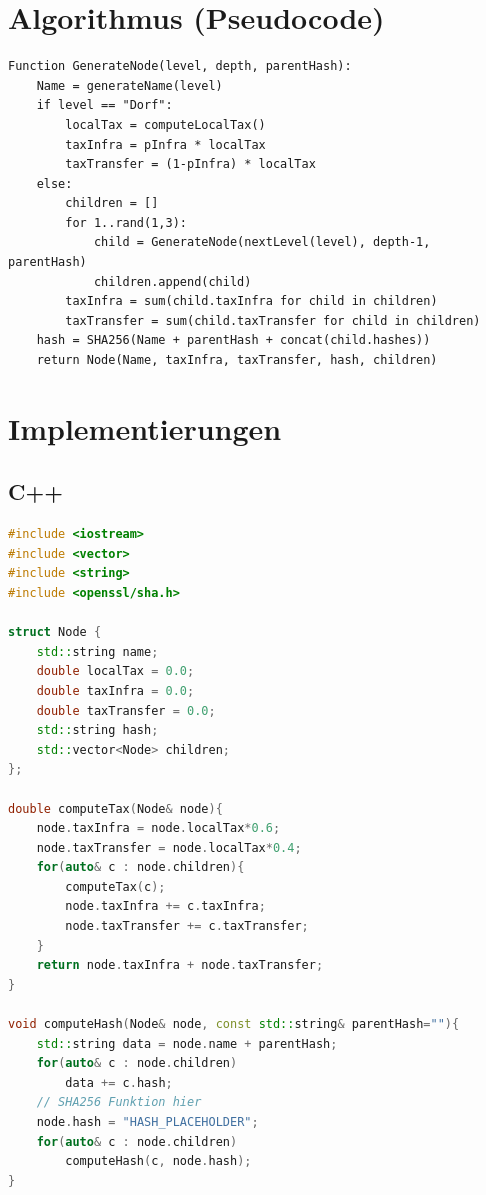 \documentclass[a4paper,12pt]{article}
\begin{document}
\section{Algorithmus (Pseudocode)}
\begin{verbatim}
Function GenerateNode(level, depth, parentHash):
    Name = generateName(level)
    if level == "Dorf":
        localTax = computeLocalTax()
        taxInfra = pInfra * localTax
        taxTransfer = (1-pInfra) * localTax
    else:
        children = []
        for 1..rand(1,3):
            child = GenerateNode(nextLevel(level), depth-1, parentHash)
            children.append(child)
        taxInfra = sum(child.taxInfra for child in children)
        taxTransfer = sum(child.taxTransfer for child in children)
    hash = SHA256(Name + parentHash + concat(child.hashes))
    return Node(Name, taxInfra, taxTransfer, hash, children)
\end{verbatim}

\section{Implementierungen}

\subsection{C++}
\begin{lstlisting}[language=C++]
#include <iostream>
#include <vector>
#include <string>
#include <openssl/sha.h>

struct Node {
    std::string name;
    double localTax = 0.0;
    double taxInfra = 0.0;
    double taxTransfer = 0.0;
    std::string hash;
    std::vector<Node> children;
};

double computeTax(Node& node){
    node.taxInfra = node.localTax*0.6;
    node.taxTransfer = node.localTax*0.4;
    for(auto& c : node.children){
        computeTax(c);
        node.taxInfra += c.taxInfra;
        node.taxTransfer += c.taxTransfer;
    }
    return node.taxInfra + node.taxTransfer;
}

void computeHash(Node& node, const std::string& parentHash=""){
    std::string data = node.name + parentHash;
    for(auto& c : node.children)
        data += c.hash;
    // SHA256 Funktion hier
    node.hash = "HASH_PLACEHOLDER";
    for(auto& c : node.children)
        computeHash(c, node.hash);
}
\end{lstlisting}
\end{document}
